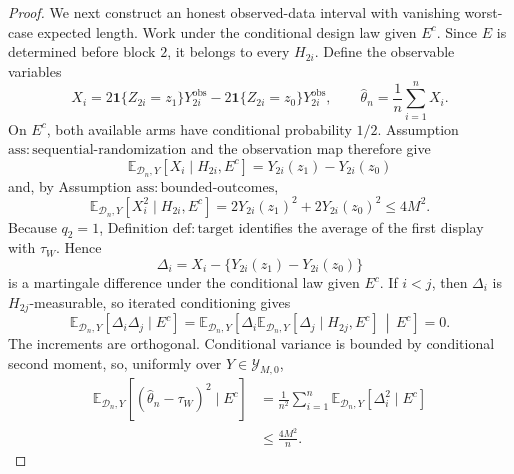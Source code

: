 \documentclass{article}
\begin{document}
\begin{proof}
We next construct an honest observed-data interval with vanishing worst-case expected length.  Work under the conditional design law given \(E^c\).  Since \(E\) is determined before block \(2\), it belongs to every \(H_{2i}\).  Define the observable variables
\[
 X_i=2\mathbf 1\{Z_{2i}=z_1\}Y^{\mathrm{obs}}_{2i}
     -2\mathbf 1\{Z_{2i}=z_0\}Y^{\mathrm{obs}}_{2i},
 \qquad
 \widehat\theta_n=\frac1n\sum_{i=1}^{n}X_i.
\]
On \(E^c\), both available arms have conditional probability \(1/2\).  Assumption \(\mathrm{ass:sequential\text{-}randomization}\) and the observation map therefore give
\[
 \mathbb E_{\mathcal D_n,Y}[X_i\mid H_{2i},E^c]
 =Y_{2i}(z_1)-Y_{2i}(z_0)
\]
and, by Assumption \(\mathrm{ass:bounded\text{-}outcomes}\),
\[
 \mathbb E_{\mathcal D_n,Y}[X_i^2\mid H_{2i},E^c]
 =2Y_{2i}(z_1)^2+2Y_{2i}(z_0)^2
 \le4M^2.
\]
Because \(q_2=1\), Definition \(\mathrm{def:target}\) identifies the average of the first display with \(\tau_W\).  Hence
\[
 \Delta_i=X_i-\{Y_{2i}(z_1)-Y_{2i}(z_0)\}
\]
is a martingale difference under the conditional law given \(E^c\).  If \(i<j\), then \(\Delta_i\) is \(H_{2j}\)-measurable, so iterated conditioning gives
\[
 \mathbb E_{\mathcal D_n,Y}[\Delta_i\Delta_j\mid E^c]
 =\mathbb E_{\mathcal D_n,Y}
 \left[
  \Delta_i\mathbb E_{\mathcal D_n,Y}[\Delta_j\mid H_{2j},E^c]
  \,\middle|\,E^c
 \right]=0.
\]
The increments are orthogonal.  Conditional variance is bounded by conditional second moment, so, uniformly over \(Y\in\mathcal Y_{M,0}\),
\[
\begin{aligned}
 \mathbb E_{\mathcal D_n,Y}
 [ (\widehat\theta_n-\tau_W)^2\mid E^c]
 &=\frac1{n^2}\sum_{i=1}^{n}
   \mathbb E_{\mathcal D_n,Y}[\Delta_i^2\mid E^c]\\
 &\le\frac{4M^2}{n}.
\end{aligned}
\]


\end{proof}
\end{document}
